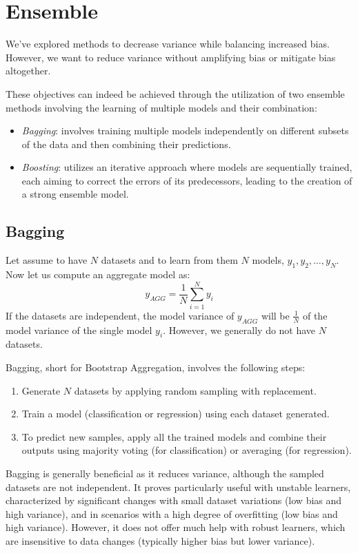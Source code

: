 \section{Ensemble}

We've explored methods to decrease variance while balancing increased bias.
However, we want to reduce variance without amplifying bias or mitigate bias altogether. 

These objectives can indeed be achieved through the utilization of two ensemble methods involving the learning of multiple models and their combination:
\begin{itemize}
    \item \textit{Bagging}: involves training multiple models independently on different subsets of the data and then combining their predictions.
    \item \textit{Boosting}: utilizes an iterative approach where models are sequentially trained, each aiming to correct the errors of its predecessors, leading to the creation of a strong ensemble model.
\end{itemize}

\subsection{Bagging}
Let assume to have $N$ datasets and to learn from them $N$ models, $y_1,y_2,\dots,y_N$. 
Now let us compute an aggregate model as: 
\[y_{AGG}=\dfrac{1}{N}\sum_{i=1}^{N}y_i\]
If the datasets are independent, the model variance of $y_{AGG}$ will be $\frac{1}{N}$ of the model variance of the single model $y_i$.
However, we generally do not have $N$ datasets. 

Bagging, short for Bootstrap Aggregation, involves the following steps:
\begin{enumerate}
    \item Generate $N$ datasets by applying random sampling with replacement.
    \item Train a model (classification or regression) using each dataset generated.
    \item To predict new samples, apply all the trained models and combine their outputs using majority voting (for classification) or averaging (for regression).
\end{enumerate}
Bagging is generally beneficial as it reduces variance, although the sampled datasets are not independent. 
It proves particularly useful with unstable learners, characterized by significant changes with small dataset variations (low bias and high variance), and in scenarios with a high degree of overfitting (low bias and high variance). 
However, it does not offer much help with robust learners, which are insensitive to data changes (typically higher bias but lower variance).

